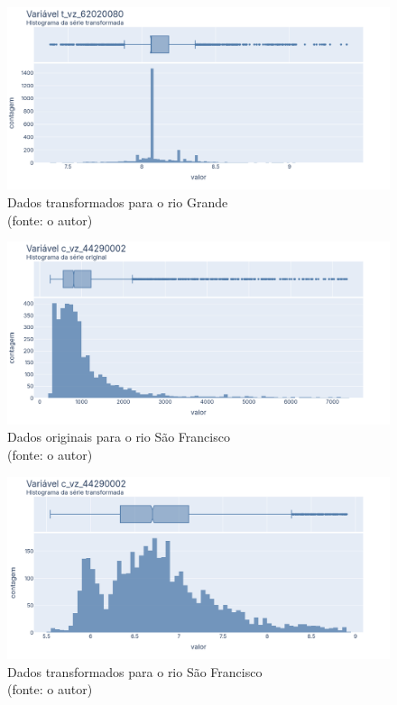 \begin{figure}[!h]
	\centering
	\includegraphics[scale=0.33]{Figuras/rio_grande/rio_grande_depois_log.png}
	\caption{Dados transformados para o rio Grande\\(fonte: o autor)}
	\label{fig:rio_grande_depois_log}
\end{figure}

\begin{figure}[!h]
	\centering
	\includegraphics[scale=0.33]{Figuras/rio_sao_francisco/rio_sao_francisco_antes_log.png}
	\caption{Dados originais para o rio São Francisco\\(fonte: o autor)}
	\label{fig:rio_sao_francisco_antes_log}
\end{figure}

\begin{figure}[!h]
	\centering
	\includegraphics[scale=0.33]{Figuras/rio_sao_francisco/rio_sao_francisco_depois_log.png}
	\caption{Dados transformados para o rio São Francisco\\(fonte: o autor)}
	\label{fig:rio_sao_francisco_depois_log}
\end{figure}
\clearpage

